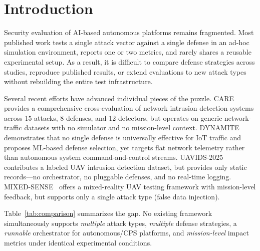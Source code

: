 \section{Introduction} \label{sec:intro}

Security evaluation of AI-based autonomous platforms remains fragmented.
Most published work tests a single attack vector against a single defense
in an ad-hoc simulation environment, reports one or two metrics, and
rarely shares a reusable experimental setup.  As a result, it is
difficult to compare defense strategies across studies, reproduce
published results, or extend evaluations to new attack types without
rebuilding the entire test infrastructure.

Several recent efforts have advanced individual pieces of the puzzle.
CARE~\cite{care2024} provides a comprehensive cross-evaluation of
network intrusion detection systems across 15 attacks, 8 defenses, and
12 detectors, but operates on generic network-traffic datasets with no
simulator and no mission-level context.
DYNAMITE~\cite{dynamite2025} demonstrates that no single defense is
universally effective for IoT traffic and proposes ML-based defense
selection, yet targets flat network telemetry rather than autonomous
system command-and-control streams.
UAVIDS-2025~\cite{uavids2025} contributes a labeled UAV intrusion
detection dataset, but provides only static records---no orchestrator, no
pluggable defenses, and no real-time logging.
MIXED-SENSE~\cite{mixedsense2025} offers a mixed-reality UAV testing
framework with mission-level feedback, but supports only a single attack
type (false data injection).

Table~\ref{tab:comparison} summarizes the gap.  No existing framework
simultaneously supports \emph{multiple} attack types, \emph{multiple}
defense strategies, a \emph{runnable} orchestrator for autonomous/CPS
platforms, and \emph{mission-level} impact metrics under identical
experimental conditions.

